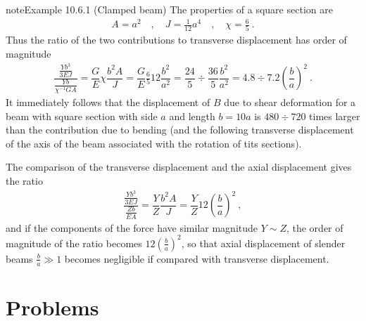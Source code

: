 \documentclass[letterpaper,10pt,english]{jupyterBook}
\begin{document}
\begin{sphinxadmonition}{note}{Example 10.6.1 (Clamped beam)}
\sphinxAtStartPar
The properties of a square section are
\begin{equation*}
\begin{split}A = a^2 \quad , \quad J = \frac{1}{12} a^4 \quad , \quad \chi = \frac{6}{5} \ .\end{split}
\end{equation*}
\sphinxAtStartPar
Thus the ratio of the two contributions to transverse displacement has order of magnitude
\begin{equation*}
\begin{split}\dfrac{\frac{Y b^3}{3 EJ}}{\frac{Yb}{ \chi^{-1} G A}} = \dfrac{G}{E} \chi \dfrac{ b^2 A }{ J } = \dfrac{G}{E} \frac{6}{5} 12 \dfrac{b^2}{a^2} = \dfrac{24}{5} \div \dfrac{36}{5} \dfrac{b^2}{a^2} = 4.8 \div 7.2 \left( \dfrac{b}{a} \right)^2 \ .\end{split}
\end{equation*}
\sphinxAtStartPar
It immediately follows that the displacement of \(B\) due to shear deformation for a beam with square section with side \(a\) and length \(b = 10 a\) is \(480 \div 720\) times larger than the contribution due to bending (and the following transverse displacement of the axis of the beam associated with the rotation of tits sections).

\sphinxAtStartPar
{} The comparison of the transverse displacement and the axial displacement gives the ratio
\begin{equation*}
\begin{split}\dfrac{\frac{Y b^3}{3 EJ}}{\frac{Z b}{E A}} = \dfrac{Y}{Z} \dfrac{ b^2 A }{ J } = \dfrac{Y}{Z} 12 \left(\dfrac{b}{a}\right)^2 \ ,\end{split}
\end{equation*}
\sphinxAtStartPar
and if the components of the force have similar magnitude \(Y \sim Z\), the order of magnitude of the ratio becomes \(12 \left( \frac{b}{a} \right)^2\), so that axial displacement of slender beams \(\frac{b}{a} \gg 1\) becomes negligible if compared with transverse displacement.
\end{sphinxadmonition}

\sphinxstepscope


\section{Problems}
\label{\detokenize{ch/solids/beams/problems:problems}}\label{\detokenize{ch/solids/beams/problems:solid-mechanics-small-displacements-beams-problems}}\label{\detokenize{ch/solids/beams/problems::doc}}
\end{document}
